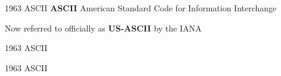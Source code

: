 \documentclass[../index.tex]{subfiles}
\begin{document}
\renewcommand{\currenttitle}{1963 \textendash{} ASCII}
\begin{frame}{\currenttitle}
%
  \textbf{ASCII} \textendash{} American Standard Code for Information Interchange \\

  \vspace*{1em}

  Now referred to officially as \textbf{US-ASCII} by the IANA
\end{frame}

\begin{frame}{\currenttitle}
%
%
%
%
  \vspace*{1em}

  \scriptsize
  
  \normalsize
\end{frame}

\begin{frame}{\currenttitle}
%
  \vspace*{1em}

  \scriptsize
  
  \normalsize
\end{frame}
\end{document}
